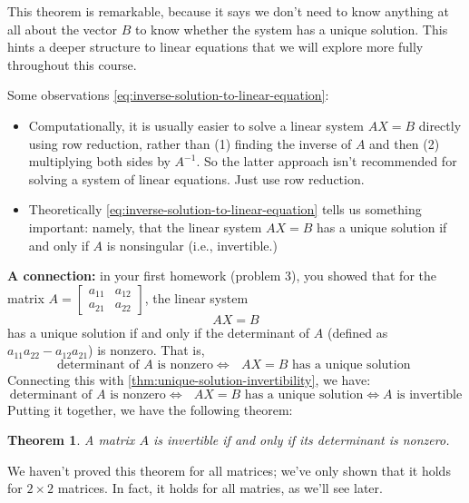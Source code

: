 \documentclass[10pt]{article}
\newtheorem{theorem}{Theorem}
\theoremstyle{definition}
\begin{document}
This theorem is remarkable, because it says we don't need to know anything
at all about the vector $B$ to know whether the system has a unique solution.
This hints a deeper structure to linear equations that we will explore more
fully throughout this course.



Some observations \cref{eq:inverse-solution-to-linear-equation}:
\begin{itemize}
  \item Computationally, it is usually easier to solve a linear system $AX=B$
  directly using row reduction, rather than (1) finding the inverse of $A$ and
  then (2) multiplying both sides by $A^{-1}$. So the latter approach isn't
  recommended for solving a system of linear equations. Just use row
  reduction.
  \item Theoretically \cref{eq:inverse-solution-to-linear-equation} tells us
  something important: namely, that the linear system $AX=B$ has a unique
  solution if and only if $A$ is nonsingular (i.e., invertible.)
\end{itemize}

\textbf{A connection:} in your first homework (problem 3), you showed that for
the matrix $A=
\begin{bmatrix}
  a_{11}&a_{12}\\
  a_{21}&a_{22}
\end{bmatrix}
$, the linear system
\begin{equation*}
  AX=B
\end{equation*}
has a unique solution if and only if the determinant of $A$ (defined as
$a_{11}a_{22}-a_{12}a_{21}$) is nonzero. That is,
\begin{equation*}
  \text{determinant of $A$ is nonzero} \iff \text{ $AX=B$ has a unique solution }
\end{equation*}
Connecting this with \cref{thm:unique-solution-invertibility}, we have:
\begin{equation*}
  \text{determinant of $A$ is nonzero} \iff \text{ $AX=B$ has a unique solution} \iff
  \text{$A$ is invertible}
\end{equation*}
Putting it together, we have the following theorem:
\begin{theorem}
  A matrix $A$ is invertible if and only if its determinant is nonzero.
\end{theorem}
We haven't proved this theorem for all matrices; we've only shown that it
holds for $2\times 2$ matrices. In fact, it holds for all matries, as we'll
see later.
\end{document}
